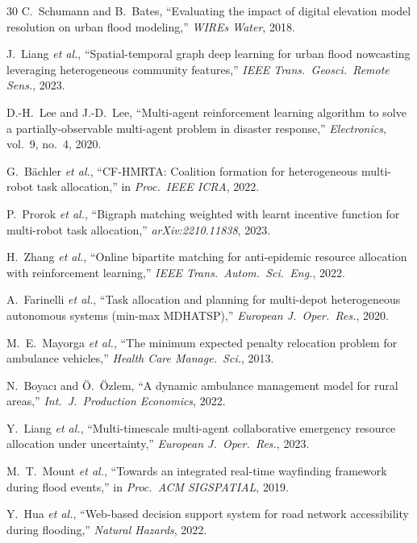 \documentclass[conference]{IEEEtran}
\begin{document}
\begin{thebibliography}{30}
C.~Schumann and B.~Bates,
``Evaluating the impact of digital elevation model resolution on urban flood
modeling,''
\textit{WIREs Water}, 2018.

J.~Liang \textit{et al.},
``Spatial-temporal graph deep learning for urban flood nowcasting leveraging
heterogeneous community features,''
\textit{IEEE Trans.\ Geosci.\ Remote Sens.}, 2023.

D.-H.~Lee and J.-D.~Lee,
``Multi-agent reinforcement learning algorithm to solve a
partially-observable multi-agent problem in disaster response,''
\textit{Electronics}, vol.~9, no.~4, 2020.

G.~Bächler \textit{et al.},
``CF-HMRTA: Coalition formation for heterogeneous multi-robot task
allocation,''
in \textit{Proc.\ IEEE ICRA}, 2022.

P.~Prorok \textit{et al.},
``Bigraph matching weighted with learnt incentive function for multi-robot
task allocation,''
\textit{arXiv:2210.11838}, 2023.

H.~Zhang \textit{et al.},
``Online bipartite matching for anti-epidemic resource allocation with
reinforcement learning,''
\textit{IEEE Trans.\ Autom.\ Sci.\ Eng.}, 2022.

A.~Farinelli \textit{et al.},
``Task allocation and planning for multi-depot heterogeneous autonomous
systems (min-max MDHATSP),''
\textit{European J.\ Oper.\ Res.}, 2020.

M.~E.~Mayorga \textit{et al.},
``The minimum expected penalty relocation problem for ambulance vehicles,''
\textit{Health Care Manage.\ Sci.}, 2013.

N.~Boyacı and Ö.~Özlem,
``A dynamic ambulance management model for rural areas,''
\textit{Int.\ J.\ Production Economics}, 2022.

Y.~Liang \textit{et al.},
``Multi-timescale multi-agent collaborative emergency resource allocation
under uncertainty,''
\textit{European J.\ Oper.\ Res.}, 2023.

M.~T.~Mount \textit{et al.},
``Towards an integrated real-time wayfinding framework during flood events,''
in \textit{Proc.\ ACM SIGSPATIAL}, 2019.

Y.~Hua \textit{et al.},
``Web-based decision support system for road network accessibility during
flooding,''
\textit{Natural Hazards}, 2022.


\end{thebibliography}
\end{document}
